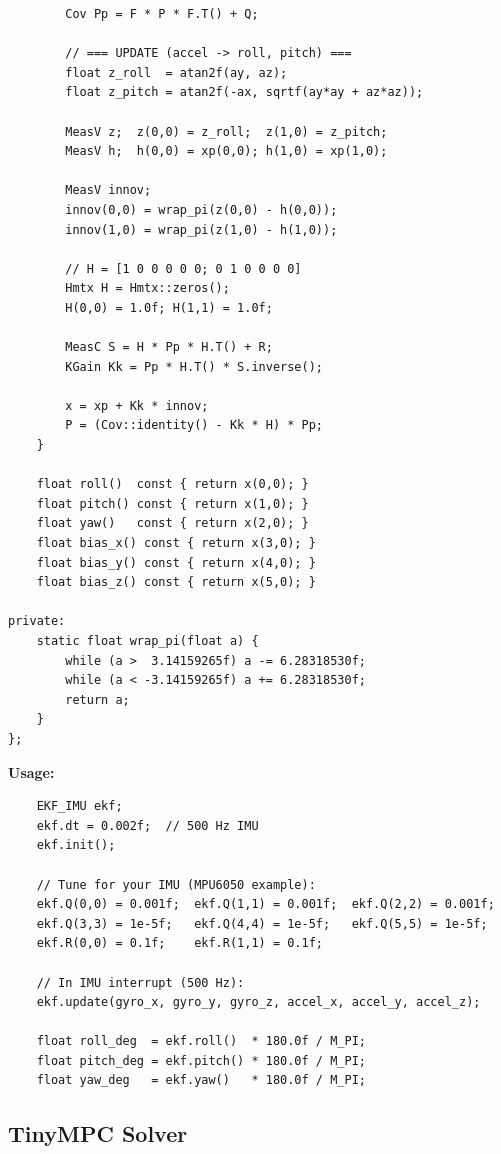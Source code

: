 \begin{verbatim}
        Cov Pp = F * P * F.T() + Q;

        // === UPDATE (accel -> roll, pitch) ===
        float z_roll  = atan2f(ay, az);
        float z_pitch = atan2f(-ax, sqrtf(ay*ay + az*az));

        MeasV z;  z(0,0) = z_roll;  z(1,0) = z_pitch;
        MeasV h;  h(0,0) = xp(0,0); h(1,0) = xp(1,0);

        MeasV innov;
        innov(0,0) = wrap_pi(z(0,0) - h(0,0));
        innov(1,0) = wrap_pi(z(1,0) - h(1,0));

        // H = [1 0 0 0 0 0; 0 1 0 0 0 0]
        Hmtx H = Hmtx::zeros();
        H(0,0) = 1.0f; H(1,1) = 1.0f;

        MeasC S = H * Pp * H.T() + R;
        KGain Kk = Pp * H.T() * S.inverse();

        x = xp + Kk * innov;
        P = (Cov::identity() - Kk * H) * Pp;
    }

    float roll()  const { return x(0,0); }
    float pitch() const { return x(1,0); }
    float yaw()   const { return x(2,0); }
    float bias_x() const { return x(3,0); }
    float bias_y() const { return x(4,0); }
    float bias_z() const { return x(5,0); }

private:
    static float wrap_pi(float a) {
        while (a >  3.14159265f) a -= 6.28318530f;
        while (a < -3.14159265f) a += 6.28318530f;
        return a;
    }
};
\end{verbatim}

\textbf{Usage:}
\begin{verbatim}
    EKF_IMU ekf;
    ekf.dt = 0.002f;  // 500 Hz IMU
    ekf.init();

    // Tune for your IMU (MPU6050 example):
    ekf.Q(0,0) = 0.001f;  ekf.Q(1,1) = 0.001f;  ekf.Q(2,2) = 0.001f;
    ekf.Q(3,3) = 1e-5f;   ekf.Q(4,4) = 1e-5f;   ekf.Q(5,5) = 1e-5f;
    ekf.R(0,0) = 0.1f;    ekf.R(1,1) = 0.1f;

    // In IMU interrupt (500 Hz):
    ekf.update(gyro_x, gyro_y, gyro_z, accel_x, accel_y, accel_z);

    float roll_deg  = ekf.roll()  * 180.0f / M_PI;
    float pitch_deg = ekf.pitch() * 180.0f / M_PI;
    float yaw_deg   = ekf.yaw()   * 180.0f / M_PI;
\end{verbatim}

\subsection{TinyMPC Solver}

